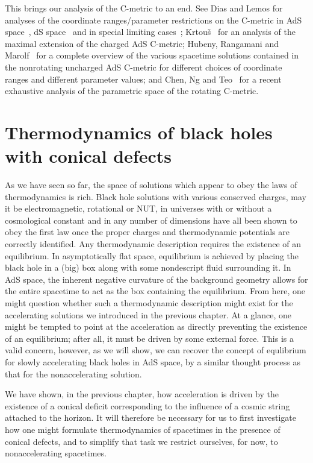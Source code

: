 \documentclass[
twoside,
openright,
frontopenright,
]{dmathesis}
\begin{document}
This brings our analysis of the C-metric to an end. See Dias and Lemos for
analyses of the coordinate ranges/parameter restrictions on the C-metric in AdS
space~\cite{Dias:2002mi}, dS space~\cite{Dias:2003xp} and in special limiting
cases~\cite{Dias:2003up}; Krtou\v s~\cite{Krtous:2005ej} for an analysis of the
maximal extension of the charged AdS C-metric; Hubeny, Rangamani and
Marolf~\cite{Hubeny:2009kz} for a complete overview of the various spacetime
solutions contained in the nonrotating uncharged AdS C-metric for different
choices of coordinate ranges and different parameter values; and Chen, Ng and
Teo~\cite{Chen:2016rjt,Chen:2016jxv} for a recent exhaustive analysis of the
parametric space of the rotating C-metric.


\chapter{Thermodynamics of black holes with conical defects}
\label{cha:td-conical}

As we have seen so far, the space of solutions which appear to obey the laws of
thermodynamics is rich. Black hole solutions with various conserved charges, may
it be electromagnetic, rotational or NUT, in universes with or without a
cosmological constant and in any number of dimensions have all been shown to
obey the first law once the proper charges and thermodynamic potentials are
correctly identified. Any thermodynamic description requires the existence of an
equilibrium. In asymptotically flat space, equilibrium is achieved by placing
the black hole in a (big) box along with some nondescript fluid surrounding
it. In AdS space, the inherent negative curvature of the background geometry
allows for the entire spacetime to act as the box containing the
equilibrium. From here, one might question whether such a thermodynamic
description might exist for the accelerating solutions we introduced in the
previous chapter. At a glance, one might be tempted to point at the acceleration
as directly preventing the existence of an equilibrium; after all, it must be
driven by some external force. This is a valid concern, however, as we will
show, we can recover the concept of equlibrium for slowly accelerating black
holes in AdS space, by a similar thought process as that for the nonaccelerating
solution.

We have shown, in the previous chapter, how acceleration is driven by the
existence of a conical deficit corresponding to the influence of a cosmic string
attached to the horizon. It will therefore be necessary for us to first
investigate how one might formulate thermodynamics of spacetimes in the presence
of conical defects, and to simplify that task we restrict ourselves, for now, to
nonaccelerating spacetimes.
\end{document}
